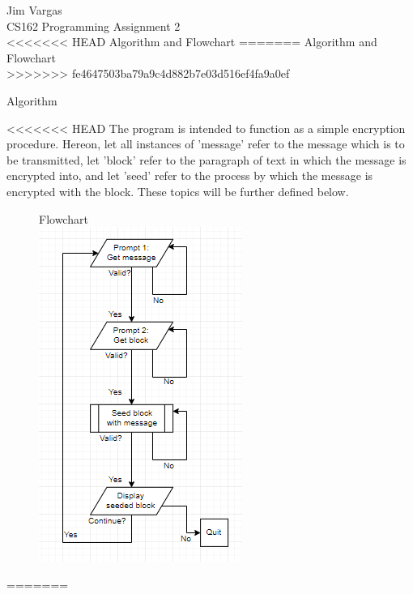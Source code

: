 \documentclass[12]{article}
\begin{document}
\onehalfspacing
\noindent
Jim Vargas\\
CS162 Programming Assignment 2\\
<<<<<<< HEAD
Algorithm and Flowchart
=======
Algorithm and Flowchart\\
>>>>>>> fe4647503ba79a9c4d882b7e03d516ef4fa9a0ef
\begin{center}
Algorithm
\end{center}

<<<<<<< HEAD
	The program is intended to function as a simple encryption procedure. Hereon, let all instances of 'message' refer to the message which is to be transmitted, let 'block' refer to the paragraph of text in which the message is encrypted into, and let 'seed' refer to the process by which the message is encrypted with the block. These topics will be further defined below.
	

\begin{figure}
Flowchart\\
\centering
\includegraphics[scale=1]{flowchart.PNG}\\
\end{figure}

=======
\end{document}
